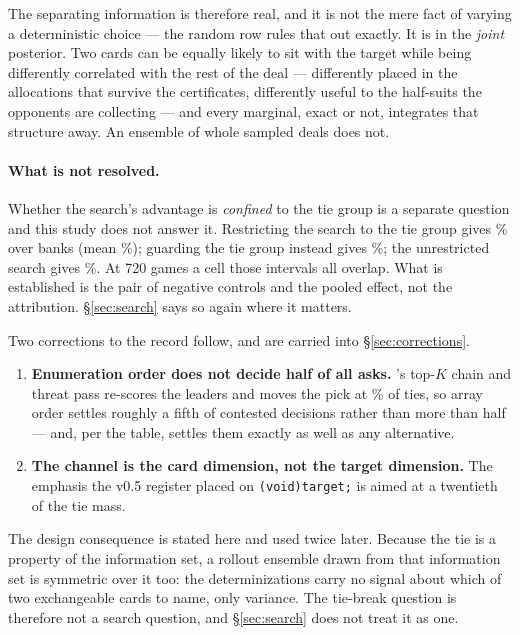 The separating information is therefore real, and it is not the mere fact of varying a
deterministic choice --- the random row rules that out exactly. It is in the \emph{joint}
posterior. Two cards can be equally likely to sit with the target while being differently correlated
with the rest of the deal --- differently placed in the allocations that survive the certificates,
differently useful to the half-suits the opponents are collecting --- and every marginal, exact or
not, integrates that structure away. An ensemble of whole sampled deals does not.

\paragraph{What is not resolved.} Whether the search's advantage is \emph{confined} to the tie
group is a separate question and this study does not answer it. Restricting the search to the tie
group gives \vsixTieSearchBankList\% over \vsixTieSearchBanks{} banks (mean
\vsixTieSearchMean\%); guarding the tie group
instead gives \vsixSearchTieGuardedWin\%; the unrestricted search gives \vsixSearchPooled\%. At
720 games a cell those intervals all overlap. What is established is the pair of negative controls
and the pooled effect, not the attribution. \S\ref{sec:search} says so again where it matters.

Two corrections to the record follow, and are carried into \S\ref{sec:corrections}.

\begin{enumerate}
\item \textbf{Enumeration order does not decide half of all asks.} \vfive{}'s top-$K$ chain and
  threat pass re-scores the leaders and moves the pick at \vsixTieShipMovedFive\% of ties, so array
  order settles roughly a fifth of contested decisions rather than more than half --- and, per the
  table, settles them exactly as well as any alternative.
\item \textbf{The channel is the card dimension, not the target dimension.} The emphasis the v0.5
  register placed on \texttt{(void)target;} is aimed at a twentieth of the tie mass.
\end{enumerate}

The design consequence is stated here and used twice later. Because the tie is a property of the
information set, a rollout ensemble drawn from that information set is symmetric over it too: the
determinizations carry no signal about which of two exchangeable cards to name, only variance. The
tie-break question is therefore not a search question, and \S\ref{sec:search} does not treat it as
one.


